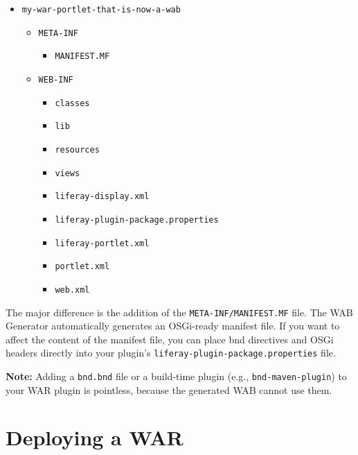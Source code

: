 \begin{itemize}
\tightlist
\item
  \texttt{my-war-portlet-that-is-now-a-wab}

  \begin{itemize}
  \tightlist
  \item
    \texttt{META-INF}

    \begin{itemize}
    \tightlist
    \item
      \texttt{MANIFEST.MF}
    \end{itemize}
  \item
    \texttt{WEB-INF}

    \begin{itemize}
    \tightlist
    \item
      \texttt{classes}
    \item
      \texttt{lib}
    \item
      \texttt{resources}
    \item
      \texttt{views}
    \item
      \texttt{liferay-display.xml}
    \item
      \texttt{liferay-plugin-package.properties}
    \item
      \texttt{liferay-portlet.xml}
    \item
      \texttt{portlet.xml}
    \item
      \texttt{web.xml}
    \end{itemize}
  \end{itemize}
\end{itemize}

The major difference is the addition of the
\texttt{META-INF/MANIFEST.MF} file. The WAB Generator automatically
generates an OSGi-ready manifest file. If you want to affect the content
of the manifest file, you can place bnd directives and OSGi headers
directly into your plugin's \texttt{liferay-plugin-package.properties}
file.

\noindent\hrulefill

\textbf{Note:} Adding a \texttt{bnd.bnd} file or a build-time plugin
(e.g., \texttt{bnd-maven-plugin}) to your WAR plugin is pointless,
because the generated WAB cannot use them.

\noindent\hrulefill

\section{Deploying a WAR}\label{deploying-a-war}

